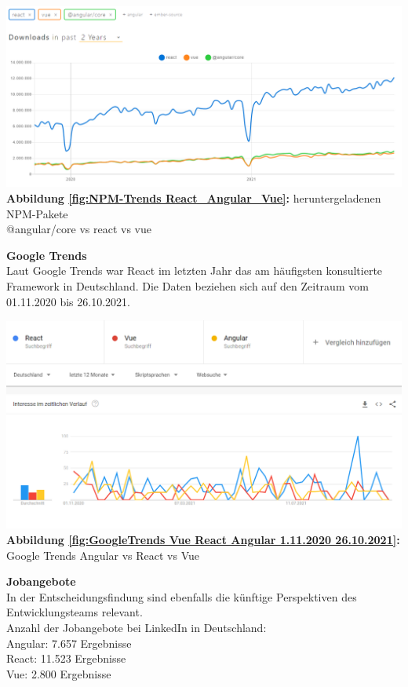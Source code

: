 \begin{center}
  \includegraphics[scale=0.4]{sources/NPM-Trends React_Angular_Vue}\label{fig:NPM-Trends React_Angular_Vue}\\
  \textbf{Abbildung \autoref{fig:NPM-Trends React_Angular_Vue}:} heruntergeladenen NPM-Pakete \\@angular/core vs react vs vue
    {\cite{NPM01}}
\end{center}

\textbf{Google Trends}\\
Laut Google Trends war React im letzten Jahr das am häufigsten konsultierte Framework in Deutschland.
Die Daten beziehen sich auf den Zeitraum vom 01.11.2020 bis 26.10.2021.
\begin{center}
  \includegraphics[scale=0.5]{sources/GoogleTrends Vue React Angular 1.11.2020 26.10.2021}\label{fig:GoogleTrends Vue React Angular 1.11.2020 26.10.2021}\\
  \textbf{Abbildung \autoref{fig:GoogleTrends Vue React Angular 1.11.2020 26.10.2021}:} Google Trends Angular vs React vs Vue
    {\cite{GO01}}
\end{center}

\textbf{Jobangebote}\\
In der Entscheidungsfindung sind ebenfalls die künftige Perspektiven des \\Entwicklungsteams relevant.
\\
Anzahl der Jobangebote bei LinkedIn in Deutschland:
\\
Angular: 7.657 Ergebnisse{\cite{LI3}}
\\
React: 11.523 Ergebnisse{\cite{LI2}}
\\
Vue: 2.800 Ergebnisse{\cite{LI1}}



